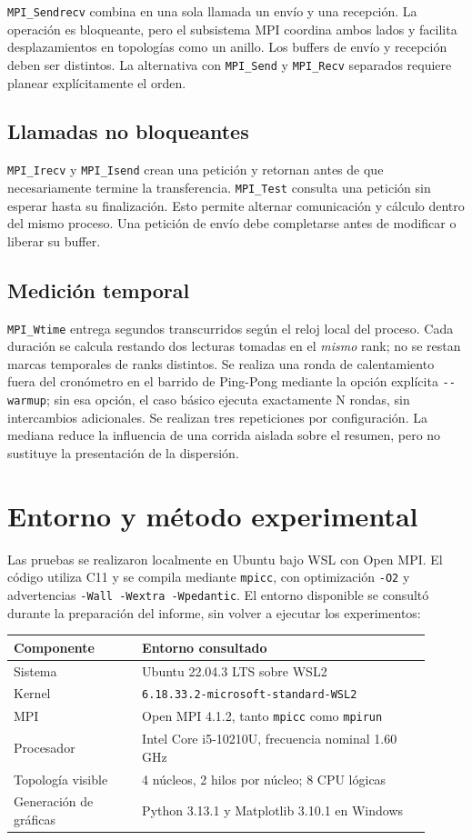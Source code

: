 \documentclass[11pt,letterpaper]{article}
\newcommand{\heading}[1]{\section{\textcolor{azul}{#1}}}
\newcommand{\subheading}[1]{\subsection{\textcolor{azul}{#1}}}
\begin{document}
\texttt{MPI\_Sendrecv} combina en una sola llamada un envío y una recepción.
La operación es bloqueante, pero el subsistema MPI coordina ambos lados y
facilita desplazamientos en topologías como un anillo. Los buffers de envío
y recepción deben ser distintos. La alternativa con \texttt{MPI\_Send} y
\texttt{MPI\_Recv} separados requiere planear explícitamente el orden.

\subheading{Llamadas no bloqueantes}

\texttt{MPI\_Irecv} y \texttt{MPI\_Isend} crean una petición y retornan
antes de que necesariamente termine la transferencia. \texttt{MPI\_Test}
consulta una petición sin esperar hasta su finalización. Esto permite
alternar comunicación y cálculo dentro del mismo proceso. Una petición de
envío debe completarse antes de modificar o liberar su buffer.

\subheading{Medición temporal}

\texttt{MPI\_Wtime} entrega segundos transcurridos según el reloj local
del proceso. Cada duración se calcula restando dos lecturas tomadas en el
\emph{mismo} rank; no se restan marcas temporales de ranks distintos. Se
realiza una ronda de calentamiento fuera del cronómetro en el barrido de
Ping-Pong mediante la opción explícita \texttt{-{}-warmup}; sin esa opción,
el caso básico ejecuta exactamente N rondas, sin intercambios adicionales.
Se realizan tres repeticiones por configuración. La mediana reduce la
influencia de una corrida aislada sobre el resumen, pero no sustituye
la presentación de la dispersión.

\heading{Entorno y método experimental}

Las pruebas se realizaron localmente en Ubuntu bajo WSL con Open MPI. El
código utiliza C11 y se compila mediante \texttt{mpicc}, con optimización
\texttt{-O2} y advertencias \texttt{-Wall -Wextra -Wpedantic}. El entorno
disponible se consultó durante la preparación del informe, sin volver a
ejecutar los experimentos:

\begin{center}
\begin{tabular}{@{}L{0.28\linewidth}L{0.63\linewidth}@{}}
\toprule
\textbf{Componente} & \textbf{Entorno consultado} \\
\midrule
Sistema & Ubuntu 22.04.3 LTS sobre WSL2 \\
Kernel & \texttt{6.18.33.2-microsoft-standard-WSL2} \\
MPI & Open MPI 4.1.2, tanto \texttt{mpicc} como \texttt{mpirun} \\
Procesador & Intel Core i5-10210U, frecuencia nominal 1.60 GHz \\
Topología visible & 4 núcleos, 2 hilos por núcleo; 8 CPU lógicas \\
Generación de gráficas & Python 3.13.1 y Matplotlib 3.10.1 en Windows \\
\bottomrule
\end{tabular}
\end{center}
\end{document}
